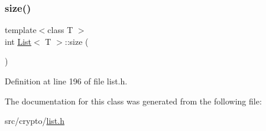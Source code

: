 \subsubsection{\texorpdfstring{size()}{size()}}
{\footnotesize\ttfamily template$<$class T $>$ \\
int \hyperlink{classList}{List}$<$ T $>$\+::size (\begin{DoxyParamCaption}{ }\end{DoxyParamCaption})}



Definition at line 196 of file list.\+h.



The documentation for this class was generated from the following file\+:\begin{DoxyCompactItemize}
\item 
src/crypto/\hyperlink{list_8h}{list.\+h}\end{DoxyCompactItemize}
